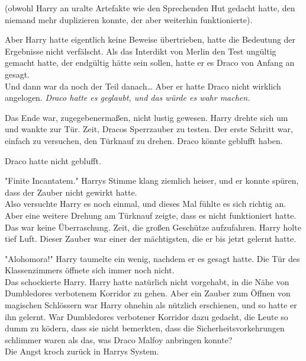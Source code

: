 {(obwohl Harry an uralte Artefakte wie den Sprechenden Hut gedacht hatte, den niemand mehr duplizieren konnte, der aber weiterhin funktionierte).

Aber Harry hatte eigentlich keine Beweise übertrieben, hatte die Bedeutung der Ergebnisse nicht verfälscht. Als das Interdikt von Merlin den Test ungültig gemacht hatte, der endgültig hätte sein sollen, hatte er es Draco von Anfang an gesagt.\\ Und dann war da noch der Teil danach… Aber er hatte Draco nicht wirklich angelogen. \emph{Draco hatte es geglaubt, und das würde es wahr machen.}

Das Ende war, zugegebenermaßen, nicht lustig gewesen. Harry drehte sich um und wankte zur Tür. Zeit, Dracos Sperrzauber zu testen. Der erste Schritt war, einfach zu versuchen, den Türknauf zu drehen. Draco könnte geblufft haben.

Draco hatte nicht geblufft.

"Finite Incantatem." Harrys Stimme klang ziemlich heiser, und er konnte spüren, dass der Zauber nicht gewirkt hatte.\\ Also versuchte Harry es noch einmal, und dieses Mal fühlte es sich richtig an. Aber eine weitere Drehung am Türknauf zeigte, dass es nicht funktioniert hatte.\\ Das war keine Überraschung. Zeit, die großen Geschütze aufzufahren. Harry holte tief Luft. Dieser Zauber war einer der mächtigsten, die er bis jetzt gelernt hatte.

"Alohomora!" Harry taumelte ein wenig, nachdem er es gesagt hatte. Die Tür des Klassenzimmers öffnete sich immer noch nicht.\\ Das schockierte Harry. Harry hatte natürlich nicht vorgehabt, in die Nähe von Dumbledores verbotenem Korridor zu gehen. Aber ein Zauber zum Öffnen von magischen Schlössern war Harry ohnehin als nützlich erschienen, und so hatte er ihn gelernt. War Dumbledores verbotener Korridor dazu gedacht, die Leute so dumm zu ködern, dass sie nicht bemerkten, dass die Sicherheitsvorkehrungen schlimmer waren als das, was Draco Malfoy anbringen konnte?\\ Die Angst kroch zurück in Harrys System.

}
